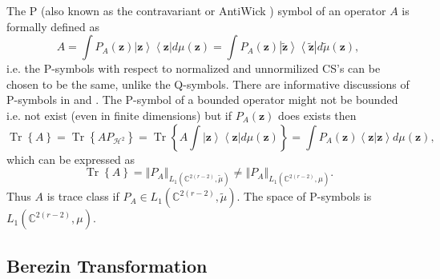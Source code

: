 \documentclass[aps,preprint]{revtex4}%
\begin{document}
\qquad The P (also known as the contravariant \cite{Berizin} or AntiWick
\cite{Peremelov}) symbol of an operator $A$ is formally defined as
\begin{equation}
A=\int P_{A}\left(  \mathbf{z}\right)  \left\vert \mathbf{z}\right\rangle
\left\langle \mathbf{z}\right\vert d\mu\left(  \mathbf{z}\right)  =\int
P_{A}\left(  \mathbf{z}\right)  \left\vert \mathbf{\tilde{z}}\right\rangle
\left\langle \mathbf{\tilde{z}}\right\vert d\tilde{\mu}\left(  \mathbf{z}%
\right)  ,
\end{equation}
i.e. the P-symbols with respect to normalized and unnormilized CS's can be
chosen to be the same, unlike the Q-symbols. There are informative discussions
of P-symbols in \cite{Tajourdhi} and \cite{Klauder}. The P-symbol of a bounded
operator might not be bounded i.e. not exist (even in finite dimensions) but
if $P_{A}\left(  \mathbf{z}\right)  $ does exists then
\begin{equation}
\operatorname*{Tr}\left\{  A\right\}  =\operatorname*{Tr}\left\{
AP_{\mathcal{H}^{2}}\right\}  =\operatorname*{Tr}\left\{  A\int\left\vert
\mathbf{z}\right\rangle \left\langle \mathbf{z}\right\vert d\mu\left(
\mathbf{z}\right)  \right\}  =\int P_{A}\left(  \mathbf{z}\right)
\left\langle \mathbf{z\left\vert \mathbf{z}\right.  }\right\rangle d\mu\left(
\mathbf{z}\right)  ,
\end{equation}
which can be expressed as
\begin{equation}
\operatorname*{Tr}\left\{  A\right\}  =\left\Vert P_{A}\right\Vert
_{L_{1}\left(  \mathbb{C}^{2\left(  r-2\right)  },\tilde{\mu}\right)  }%
\neq\left\Vert P_{A}\right\Vert _{L_{1}\left(  \mathbb{C}^{2\left(
r-2\right)  },\mu\right)  }.
\end{equation}
Thus $A$ is trace class if $P_{A}\in L_{1}\left(  \mathbb{C}^{2\left(
r-2\right)  },\tilde{\mu}\right)  $. The space of P-symbols is $L_{1}\left(
\mathbb{C}^{2\left(  r-2\right)  },\mu\right)  .$

\subsection{Berezin Transformation}
\end{document}
